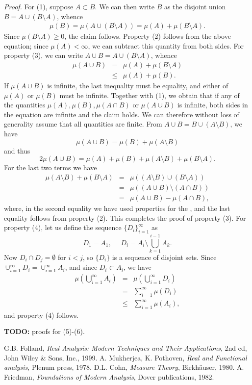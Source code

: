 \documentclass[12pt]{article}
\begin{document}
\emph{Proof.} For (1), suppose $A\subset B$. We can then 
write $B$ as the disjoint union $B=A\cup (B\setminus A)$, whence
\begin{eqnarray*}
\mu(B) = \mu(A\cup (B\setminus A)) = \mu(A) + \mu(B\setminus A).
\end{eqnarray*}
Since $\mu(B\setminus A)\ge 0$, the claim follows. 
Property (2) follows from the above equation; since
$\mu(A)<\infty$, we can subtract this quantity from both sides. 
For property (3), we can write
$A\cup B  =A\cup (B\setminus A)$, whence
\begin{eqnarray*}
\mu(A\cup B) &=& \mu(A)+\mu(B\setminus A)\\
    &\le & \mu(A)+\mu(B).
\end{eqnarray*}
If $\mu(A\cup B)$ is infinite, the last inequality must 
be equality, and either of $\mu(A)$ or $\mu(B)$ must be infinite. 
Together with (1), we obtain that if any of the quantities 
$\mu(A), \mu(B), \mu(A\cap B)$ or $\mu(A\cup B)$ is infinite, 
both sides in the equation are infinite and the claim holds. 
We can therefore
  without loss of generality assume that all quantities are finite. 
  From $A\cup B = B\cup (A\setminus B)$, we have
$$ \mu(A\cup B) = \mu(B)+\mu(A\setminus B)$$
and thus
$$ 2\mu(A\cup B) = \mu(A)+  \mu(B) + \mu(A\setminus B) + \mu(B\setminus A).$$
For the last two terms we have
\begin{eqnarray*}
\mu(A\setminus B) + \mu(B\setminus A) &=& \mu( (A\setminus B) \cup (B\setminus A)) \\
&=& \mu( (A\cup B) \setminus (A\cap B) ) \\
&=& \mu(A\cup B) - \mu(A\cap B),
\end{eqnarray*}
where, in the second equality we have used properties for the 
, and 
the last equality follows from 
property (2). This completes the proof of 
 property (3).
For property (4), let us define the sequence $\{D_i\}_{i=1}^\infty$ as
$$D_1 = A_1, \,\,\,\,\,\,\,\, D_i = A_i \setminus  \bigcup_{k=1}^{i-1} A_k .$$
Now $D_i\cap D_j=\emptyset$ for $i<j$, so $\{D_i\}$ is a sequence of 
disjoint sets.
Since $\cup_{i=1}^\infty D_i =\cup_{i=1}^\infty A_i$,  and since
$D_i\subset A_i$, we have
\begin{eqnarray*}
\mu(\bigcup_{i=1}^\infty A_i) &=& \mu(\bigcup_{i=1}^\infty D_i) \\
     &=& \sum_{i=1}^\infty \mu(D_i) \\
     &\le& \sum_{i=1}^\infty \mu(A_i),
\end{eqnarray*}
and property (4) follows.


{\bf TODO:} proofs for (5)-(6).

\begin{thebibliography}{9}
 G.B. Folland, \emph{Real Analysis: Modern Techniques and Their Applications}, 2nd ed, John Wiley \& Sons, Inc., 1999.
 A. Mukherjea, K. Pothoven,
 \emph{Real and Functional analysis},
 Plenum press, 1978.
D.L. Cohn, \emph{Measure Theory}, Birkh\"auser, 1980.
A. Friedman, 
 \emph{Foundations of Modern Analysis},
Dover publications, 1982. 
 \end{thebibliography}
\end{document}
